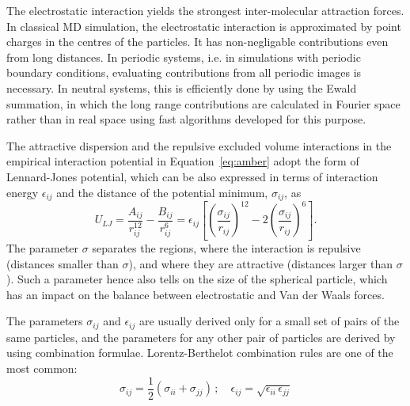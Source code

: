 The electrostatic interaction yields the strongest inter-molecular attraction forces. 
In classical MD simulation, the electrostatic interaction is approximated by point charges in the centres of the particles. 
It has non-negligable contributions even from long distances. 
In periodic systems, i.e. in simulations with periodic boundary conditions, 
evaluating contributions from all periodic images is necessary. 
In neutral systems, this is efficiently done by using the Ewald summation,
in which the long range contributions are calculated in Fourier space rather than in real space
using fast algorithms developed for this purpose. \citep{darden93, essman95}

The attractive dispersion and the repulsive excluded volume interactions 
in the empirical interaction potential in Equation~\ref{eq:amber} 
adopt the form of Lennard-Jones potential, 
which can be also expressed in terms of interaction energy $\epsilon_{ij}$ and the distance of the potential minimum, $\sigma_{ij}$, as
\begin{equation}
   U_{LJ} =  \frac{A_{ij}}{r_{ij}^{12}} - \frac{B_{ij}}{r_{ij}^6} = \epsilon _{ij} \left [ \left (\frac{\sigma _{ij}}{r_{ij}} \right )^{12} - 2 \left ( \frac{\sigma _{ij}}{r_{ij}} \right )^6 \right ] .
\end{equation}
The parameter $\sigma$ separates the regions, 
where the interaction is repulsive (distances smaller than $\sigma$), 
and where they are attractive (distances larger than $\sigma$). 
Such a parameter hence also tells on the size of the spherical particle, 
which has an impact on the balance between electrostatic and Van der Waals forces.

The parameters $\sigma_{ij}$ and $\epsilon_{ij}$ are usually derived only for a small set of pairs of the same particles,
and the parameters for any other pair of particles are derived by using combination formulae. 
Lorentz-Berthelot combination rules are one of the most common: 
\begin{equation}
 \sigma _{ij} = \frac{1}{2} (\sigma _{ii} + \sigma _{jj}) \, ; \quad \epsilon _{ij} = \sqrt{\epsilon _{ii} \, \epsilon _{jj}} 
\end{equation}














